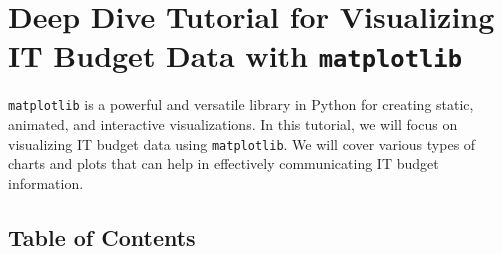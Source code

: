 \documentclass[
  letterpaper,
  DIV=11,
  numbers=noendperiod]{scrreprt}
\begin{document}

\chapter{\texorpdfstring{Deep Dive Tutorial for Visualizing IT Budget
Data with
\texttt{matplotlib}}{Deep Dive Tutorial for Visualizing IT Budget Data with matplotlib}}\label{deep-dive-tutorial-for-visualizing-it-budget-data-with-matplotlib}

\texttt{matplotlib} is a powerful and versatile library in Python for
creating static, animated, and interactive visualizations. In this
tutorial, we will focus on visualizing IT budget data using
\texttt{matplotlib}. We will cover various types of charts and plots
that can help in effectively communicating IT budget information.

\section{Table of Contents}\label{table-of-contents-24}
\end{document}
